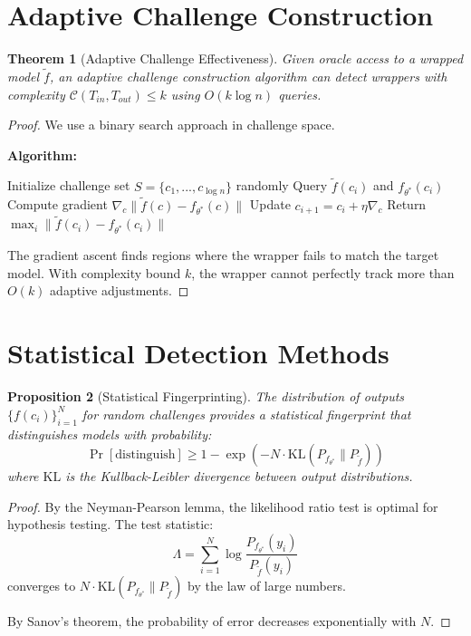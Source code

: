 \documentclass[11pt]{article}
\theoremstyle{plain}
\newtheorem{theorem}{Theorem}
\newtheorem{proposition}[theorem]{Proposition}
\begin{document}
\section{Adaptive Challenge Construction}

\begin{theorem}[Adaptive Challenge Effectiveness]
\label{thm:adaptive}
Given oracle access to a wrapped model $\tilde{f}$, an adaptive challenge 
construction algorithm can detect wrappers with complexity 
$\mathcal{C}(T_{in}, T_{out}) \leq k$ using $O(k \log n)$ queries.
\end{theorem}

\begin{proof}
We use a binary search approach in challenge space.

\textbf{Algorithm:}
\begin{algorithmic}[1]
\STATE Initialize challenge set $S = \{c_1, ..., c_{\log n}\}$ randomly
    \STATE Query $\tilde{f}(c_i)$ and $f_{\theta^*}(c_i)$
    \STATE Compute gradient $\nabla_c \|\tilde{f}(c) - f_{\theta^*}(c)\|$
    \STATE Update $c_{i+1} = c_i + \eta \nabla_c$
\ENDFOR
\STATE Return $\max_i \|\tilde{f}(c_i) - f_{\theta^*}(c_i)\|$
\end{algorithmic}

The gradient ascent finds regions where the wrapper fails to match the 
target model. With complexity bound $k$, the wrapper cannot perfectly 
track more than $O(k)$ adaptive adjustments.
\end{proof}

\section{Statistical Detection Methods}

\begin{proposition}[Statistical Fingerprinting]
The distribution of outputs $\{f(c_i)\}_{i=1}^N$ for random challenges 
provides a statistical fingerprint that distinguishes models with probability:
$$\Pr[\text{distinguish}] \geq 1 - \exp(-N \cdot \text{KL}(P_{f_{\theta^*}} \| P_{\tilde{f}}))$$
where $\text{KL}$ is the Kullback-Leibler divergence between output distributions.
\end{proposition}

\begin{proof}
By the Neyman-Pearson lemma, the likelihood ratio test is optimal for 
hypothesis testing. The test statistic:
$$\Lambda = \sum_{i=1}^N \log \frac{P_{f_{\theta^*}}(y_i)}{P_{\tilde{f}}(y_i)}$$
converges to $N \cdot \text{KL}(P_{f_{\theta^*}} \| P_{\tilde{f}})$ by the 
law of large numbers.

By Sanov's theorem, the probability of error decreases exponentially with $N$.
\end{proof}
\end{document}
